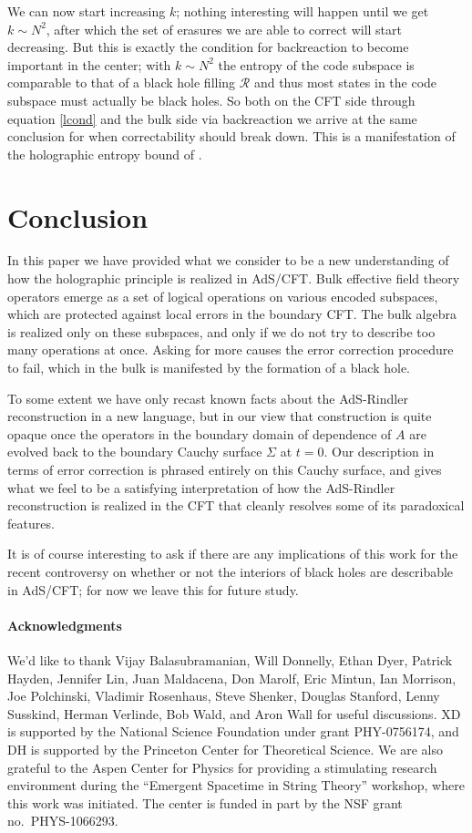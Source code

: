 \documentclass[12pt]{article}
\begin{document}
We can now start increasing $k$; nothing interesting will happen until we get $k\sim N^2$, after which the set of erasures we are able to correct will start decreasing.  But this is exactly the condition for backreaction to become important in the center; with $k\sim N^2$ the entropy of the code subspace is comparable to that of a black hole filling $\mathcal{R}$ and thus most states in the code subspace must actually be black holes.  So both on the CFT side through equation \eqref{lcond} and the bulk side via backreaction we arrive at the same conclusion for when correctability should break down.  This is a manifestation of the holographic entropy bound of \cite{Susskind:1994vu}.  

\section{Conclusion}
In this paper we have provided what we consider to be a new understanding of how the holographic principle is realized in AdS/CFT.  Bulk effective field theory operators emerge as a set of logical operations on various encoded subspaces, which are protected against local errors in the boundary CFT.  The bulk algebra is realized only on these subspaces, and only if we do not try to describe too many operations at once.  Asking for more causes the error correction procedure to fail, which in the bulk is manifested by the formation of a black hole.  

To some extent we have only recast known facts about the AdS-Rindler reconstruction in a new language, but in our view that construction is quite opaque once the operators in the boundary domain of dependence of $A$ are evolved back to the boundary Cauchy surface $\Sigma$ at $t=0$.  Our description in terms of error correction is phrased entirely on this Cauchy surface, and gives what we feel to be a satisfying interpretation of how the AdS-Rindler reconstruction is realized in the CFT that cleanly resolves some of its paradoxical features.    

It is of course interesting to ask if there are any implications of this work for the recent controversy on whether or not the interiors of black holes are describable in AdS/CFT; for now we leave this for future study.

\paragraph{Acknowledgments} We'd like to thank Vijay Balasubramanian, Will Donnelly, Ethan Dyer, Patrick Hayden, Jennifer Lin, Juan Maldacena, Don Marolf, Eric Mintun, Ian Morrison, Joe Polchinski, Vladimir Rosenhaus, Steve Shenker, Douglas Stanford, Lenny Susskind, Herman Verlinde, Bob Wald, and Aron Wall for useful discussions.  XD is supported by the National Science Foundation under grant PHY-0756174, and DH is supported by the Princeton Center for Theoretical Science.  We are also grateful to the Aspen Center for Physics for providing a stimulating research environment during the ``Emergent Spacetime in String Theory'' workshop, where this work was initiated.  The center is funded in part by the NSF grant no.\ PHYS-1066293.
\end{document}
